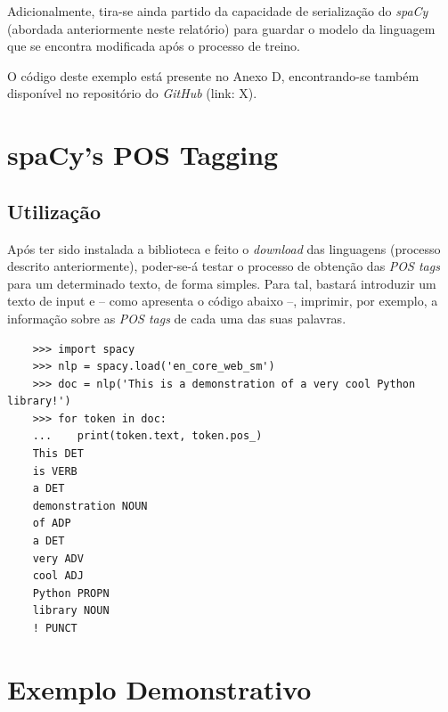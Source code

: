 \documentclass[12pt]{article}
\begin{document}
Adicionalmente, tira-se ainda partido da capacidade de serialização do \textit{spaCy} (abordada anteriormente neste relatório) para guardar o modelo da linguagem que se encontra
modificada após o processo de treino.

O código deste exemplo está presente no Anexo D, encontrando-se também disponível no repositório do \textit{GitHub} (link: X).

\section{spaCy's POS Tagging} %


\subsection{Utilização} %

Após ter sido instalada a biblioteca e feito o \textit{download} das linguagens (processo descrito anteriormente), poder-se-á testar o processo de obtenção das \textit{POS tags} para
um determinado texto, de forma simples. Para tal, bastará introduzir um texto de input e -- como apresenta o código abaixo --, imprimir, por exemplo, a informação sobre as
\textit{POS tags} de cada uma das suas palavras.

\begin{verbatim}
	>>> import spacy
	>>> nlp = spacy.load('en_core_web_sm')
	>>> doc = nlp('This is a demonstration of a very cool Python library!')
	>>> for token in doc:
	...    print(token.text, token.pos_)
	This DET
	is VERB
	a DET
	demonstration NOUN
	of ADP
	a DET
	very ADV
	cool ADJ
	Python PROPN
	library NOUN
	! PUNCT	
\end{verbatim}

\section{Exemplo Demonstrativo} %






\end{document}
